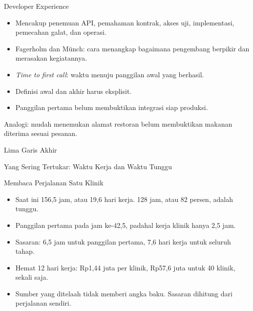 \documentclass[aspectratio=169, table, 12pt]{beamer}
\begin{document}
\begin{frame}{{\Large Developer Experience}}
  \vspace{8pt}
  \begin{itemize}
    \item Mencakup penemuan API, pemahaman kontrak, akses uji, implementasi, pemecahan galat, dan operasi.
    \item Fagerholm dan Münch: cara menangkap bagaimana pengembang berpikir dan merasakan kegiatannya.
    \item \textit{Time to first call}: waktu menuju panggilan awal yang berhasil.
    \item Definisi awal dan akhir harus eksplisit.
    \item Panggilan pertama belum membuktikan integrasi siap produksi.
  \end{itemize}
  \vspace{6pt}
  {\small Analogi: mudah menemukan alamat restoran belum membuktikan makanan diterima sesuai pesanan.}
\end{frame}

\begin{frame}{{\Large Lima Garis Akhir}}
  \centering
\end{frame}

\begin{frame}{{\Large Yang Sering Tertukar: Waktu Kerja dan Waktu Tunggu}}
  \centering
\end{frame}

\begin{frame}{{\Large Membaca Perjalanan Satu Klinik}}
  \vspace{8pt}
  \begin{itemize}
    \item Saat ini 156,5 jam, atau 19,6 hari kerja. 128 jam, atau 82 persen, adalah tunggu.
    \item Panggilan pertama pada jam ke-42,5, padahal kerja klinik hanya 2,5 jam.
    \item Sasaran: 6,5 jam untuk panggilan pertama, 7,6 hari kerja untuk seluruh tahap.
    \item Hemat 12 hari kerja: Rp1,44 juta per klinik, Rp57,6 juta untuk 40 klinik, sekali saja.
    \item Sumber yang ditelaah tidak memberi angka baku. Sasaran dihitung dari perjalanan sendiri.
  \end{itemize}
\end{frame}
\end{document}
